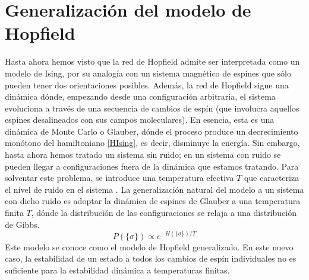 \documentclass[titlepage,12pt]{article}
\numberwithin{equation}{section}
\begin{document}
	\section{Generalización del modelo de Hopfield}
	Hasta ahora hemos visto que la red de Hopfield admite ser interpretada como un modelo de Ising, por su analogía con un sistema magnético de espines que sólo pueden tener dos orientaciones posibles. Además, la red de Hopfield sigue una dinámica dónde, empezando desde una configuración arbitraria, el sistema evoluciona a través de una secuencia de cambios de espín (que involucra aquellos espines desalineados con sus campos moleculares). En esencia, esta es una dinámica de Monte Carlo o Glauber, dónde el proceso produce un decrecimiento monótono del hamiltoniano \eqref{HIsing}, es decir, disminuye la energía. Sin embargo, hasta ahora hemos tratado un sistema sin ruido; en un sistema con ruido se pueden llegar a configuraciones fuera de la dinámica que estamos tratando. Para solventar este problema, se introduce una temperatura efectiva $T$ que caracteriza el nivel de ruido en el sistema \cite{amit1}. La generalización natural del modelo a un sistema con dicho ruido es adoptar la dinámica de espines de Glauber a una temperatura finita $T$, dónde la distribución de las configuraciones se relaja a una distribución de Gibbs.
	\begin{displaymath}
	P(\lbrace\sigma\rbrace)\propto e^{-H(\lbrace\sigma\rbrace)/T}
	\end{displaymath}
	Este modelo se conoce como el modelo de Hopfield generalizado. En este nuevo caso, la estabilidad de un estado a todos los cambios de espín individuales no es suficiente para la estabilidad dinámica a temperaturas finitas. 
\end{document}

